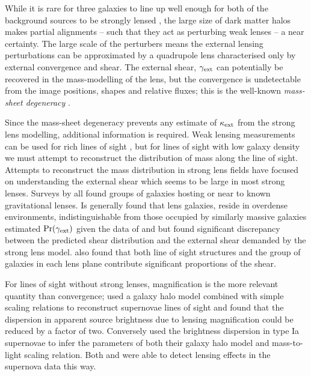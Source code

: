 \documentclass[useAMS,usenatbib,a4paper]{mn2e}
\begin{document}
While it is rare for three galaxies to line up well enough for both of
the background sources to be strongly lensed \citep{GavazziEtal2008,CollettEtal2012a}, 
the large size of dark matter halos makes partial alignments -- such that they
act as perturbing weak lenses --  a near certainty. The large scale of the
perturbers means the external lensing perturbations can be approximated
by a quadrupole lens characterised only by external convergence and shear.
The external shear, $\gamma_{\rm ext}$ can potentially be recovered in the
mass-modelling of the lens, but the convergence is undetectable from the
image positions, shapes and relative fluxes; this is the well-known {\emph{ 
mass-sheet degeneracy}} \citep[see e.g.][for details]{FalcoEtal1985}.

Since the mass-sheet degeneracy prevents any estimate of $\kappa_{\rm ext}$ from the 
strong lens modelling, additional information is required. Weak lensing measurements
can be used for rich lines of sight \citep{NakajimaEtal2009, FadelyEtal2009}, but 
for lines of sight with low galaxy density we must attempt to reconstruct the distribution
of mass along the line of sight. Attempts to reconstruct the mass distribution in strong
lens fields have focused on understanding the external shear which seems to be large in most strong lenses.
Surveys by \citet{Fassnacht+Lubin2002,AugerEtal2007,WilliamsEtal2006,MomchevaEtal2006,FassnachtEtal2006}
all found groups of galaxies hosting or near to known gravitational lenses.
Is generally found that lens galaxies, reside in overdense environments,
indistinguishable from those occupied by similarly massive galaxies \citep{Auger2008,TreuEtal2009}
\citet{WongEtal2011} estimated $\Pr(\gamma_{\rm ext})$ given the data of \citet{WilliamsEtal2006}
and \citet{MomchevaEtal2006} but found significant discrepancy between the predicted shear
distribution and the external shear demanded by the strong lens model. 
\citeauthor{WongEtal2011} also found that both line of
sight structures and the group of galaxies in each lens plane contribute
significant proportions of the shear. 

For lines of sight without strong lenses, magnification is the more relevant
quantity than convergence; \citet{GunnarssonEtal2006} used a galaxy halo model
combined with simple scaling relations to reconstruct supernovae lines of
sight and found that the dispersion in apparent source brightness due to
lensing magnification could be reduced by a factor of two. Conversely
\citet{KarpenkaEtal2012} used the brightness dispersion in type Ia supernovae
to infer the parameters of both their galaxy halo model and mass-to-light
scaling relation. Both \citeauthor{KarpenkaEtal2012} and
\citet{JonssonEtal2010} were able to  detect lensing effects in the supernova
data this way.
\end{document}
